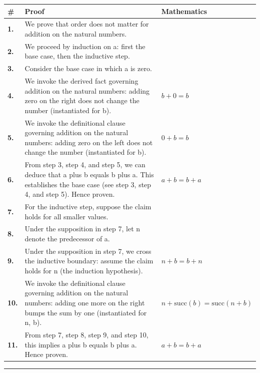 \documentclass[11pt]{article}
\theoremstyle{definition}
\begin{document}
\begin{tabular}{@{} >{\raggedright\arraybackslash}p{} >{\raggedright\arraybackslash}p{} >{\raggedleft\arraybackslash}p{} @{}}
\textbf{\#} & \textbf{Proof} & \textbf{Mathematics} \\
\midrule
\textbf{1.} & We prove that order does not matter for addition on the natural numbers. & \\[0.45em]
\textbf{2.} & We proceed by induction on a: first the base case, then the inductive step. & \\[0.45em]
\textbf{3.} & Consider the base case in which a is zero. & \\[0.45em]
\textbf{4.} & We invoke the derived fact governing addition on the natural numbers: adding zero on the right does not change the number (instantiated for b). & $\displaystyle b + 0 = b$ \\[0.45em]
\textbf{5.} & We invoke the definitional clause governing addition on the natural numbers: adding zero on the left does not change the number (instantiated for b). & $\displaystyle 0 + b = b$ \\[0.45em]
\textbf{6.} & From step 3, step 4, and step 5, we can deduce that a plus b equals b plus a. This establishes the base case (see step 3, step 4, and step 5). Hence proven. & $\displaystyle a + b = b + a$ \\[0.45em]
\textbf{7.} & For the inductive step, suppose the claim holds for all smaller values. & \\[0.45em]
\textbf{8.} & Under the supposition in step 7, let n denote the predecessor of a. & \\[0.45em]
\textbf{9.} & Under the supposition in step 7, we cross the inductive boundary: assume the claim holds for n (the induction hypothesis). & $\displaystyle n + b = b + n$ \\[0.45em]
\textbf{10.} & We invoke the definitional clause governing addition on the natural numbers: adding one more on the right bumps the sum by one (instantiated for n, b). & $\displaystyle n + \mathrm{succ}(b) = \mathrm{succ}(n + b)$ \\[0.45em]
\textbf{11.} & From step 7, step 8, step 9, and step 10, this implies a plus b equals b plus a. Hence proven. & $\displaystyle a + b = b + a$ \\[0.45em]
\bottomrule
\end{tabular}
\label{thm:Nat-addition-order_does_not_matter}
\par\medskip\hrule
\end{document}
